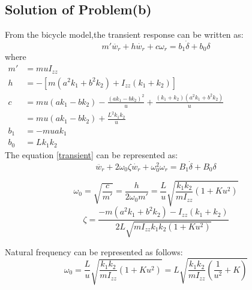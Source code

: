 \documentclass[UTF8,a4paper,11pt]{article}
\begin{document}
\subsection{Solution of Problem(b)}
From the bicycle model,the transient response can be written as:
\begin{equation}\label{transient}
m'\ddot{w_r} + h \dot{w_r} + c \omega _r = b_1\dot{ \delta } + b_0\delta 
\end{equation}
where \\
\begin{math}
\begin{aligned}
m' &= muI_{zz}\\
h & =-[m(a^{2} k_{1}+b^{2} k_{2})+I_{z z}(k_{1}+k_{2})] \\
c & =m u\left(a k_{1}-b k_{2}\right)-\frac{\left(a k_{1}-b k_{2}\right)^{2}}{u}+\frac{\left(k_{1}+k_{2}\right)\left(a^{2} k_{1}+b^{2} k_{2}\right)}{u} \\
& =m u\left(a k_{1}-b k_{2}\right)+\frac{L^{2} k_{1} k_{2}}{u} \\
b_{1} & =-m u a k_{1} \\
b_{0} & =L k_{1} k_{2} 
\end{aligned}
\end{math}\\
The equation \ref{transient} can be represented as:
$$
\ddot{w_r} + 2\omega_0\zeta  \dot{w_r} + \omega_0^{2} \omega _r = B_1\dot{ \delta } + B_0\delta 
$$

$$\omega_{0}=\sqrt{\frac{c}{m'}} =\frac{h}{2 \omega_{0} m'}=\frac{L}{u} \sqrt{\frac{k_{1} k_{2}}{m I_{z z}}\left(1+K u^{2}\right)} $$
$$\zeta=\frac{-m\left(a^{2} k_{1}+b^{2} k_{2}\right)-I_{z z}\left(k_{1}+k_{2}\right)}{2 L \sqrt{m I_{z z} k_{1} k_{2}\left(1+K u^{2}\right)}} $$

Natural frequency can be represented as follows:
\begin{equation}\label{omega1}
\omega_{0}= \frac{L}{u} \sqrt{\frac{k_{1} k_{2}}{m I_{z z}}\left(1+K u^{2}\right)} = L\sqrt{\frac{k_{1} k_{2}}{m I_{z z}}\left(\frac{1}{u^{2}}+K \right)}
\end{equation}
\end{document}
